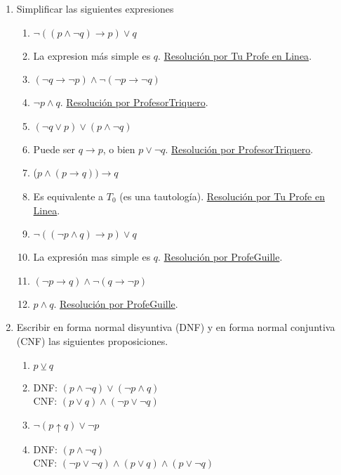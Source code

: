 \documentclass[a4paper]{article}
\newcommand{\answer}{\item[**]}
\newcommand{\exercise}{\item}
\newcommand{\then}{\to}
\newcommand{\xor}{\veebar}
\newcommand{\nand}{\uparrow}
\begin{document}
\begin{enumerate}
	\exercise Simplificar las siguientes expresiones
	\begin{multicols}{2}
	\begin{enumerate} [label=(\alph*)]

		\item $\neg ((p \land \neg q)\then p) \lor q$
		\answer La expresion más simple es $q$. \href{https://youtu.be/BOydu7cpv70}{Resolución por Tu Profe en Linea}.

		\item $(\neg q \then \neg p) \land \neg (\neg p \then \neg q)$
		\answer $\neg p \land q$. \href{https://youtu.be/p005yi28rgk?t=737}{Resolución por ProfesorTriquero}.

		\item $(\neg q \lor p) \lor (p \land \neg q)$
		\answer Puede ser $q \then p$, o bien $p \lor \neg q$. \href{https://youtu.be/p005yi28rgk?t=995}{Resolución por ProfesorTriquero}.

		\item ($p \land ( p \then q)) \then q$
		\answer Es equivalente a $T_0$ (es una tautología). \href{https://youtu.be/BOydu7cpv70?t=586}{Resolución por Tu Profe en Linea}.

		\item $\neg ((\neg p \land q) \then p) \lor q$
		\answer La expresión mas simple es $q$. \href{https://youtu.be/KyIdCTWZuJ8}{Resolución por ProfeGuille}.

		\item $(\neg p \then q) \land \neg (q \then \neg p)$
		\answer $p \land q$. \href{https://youtu.be/shOOoVRqKcA}{Resolución por ProfeGuille}.

	\end{enumerate}
	\end{multicols}

	\exercise Escribir en forma normal disyuntiva (DNF) y en forma normal conjuntiva (CNF) las siguientes proposiciones.
	\begin{multicols}{2}
	\begin{enumerate} [label=(\alph*)]

		\item $p\xor q$
		\answer DNF: $(p\land \neg q) \lor  (\neg p\land q)$ \\ CNF: $(p\lor q) \land  (\neg p\lor \neg q)$

		\item $\neg (p \nand q) \lor \neg p$
		\answer DNF: $(p\land \neg q)$  \\ CNF: $(\neg p\lor \neg q) \land  (p\lor q) \land  (p\lor \neg q)$
		

\end{enumerate}
\end{multicols}
\end{enumerate}
\end{document}
